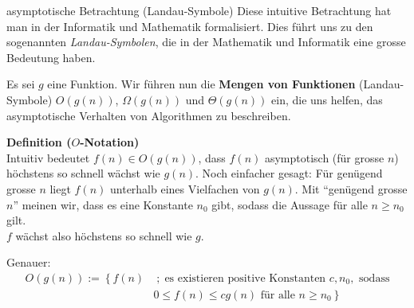 \begin{frame}{asymptotische Betrachtung (Landau-Symbole)}
	Diese intuitive Betrachtung hat man in der Informatik und Mathematik formalisiert. Dies führt uns zu den sogenannten \textit{Landau-Symbolen}, die in der Mathematik und Informatik eine grosse Bedeutung haben.

	\vspace{\baselineskip}
	Es sei $g$ eine Funktion. Wir führen nun die \textbf{Mengen von Funktionen} (Landau-Symbole) $O(g(n))$, $\Omega(g(n))$ und $\Theta(g(n))$ ein, die uns helfen, das asymptotische Verhalten von Algorithmen zu beschreiben.
\end{frame}


\begin{frame}
\textbf{Definition ($O$-Notation)}\\
Intuitiv bedeutet $f(n)\in O(g(n))$, dass $f(n)$ asymptotisch (für grosse $n$) höchstens so schnell wächst wie $g(n)$. Noch einfacher gesagt: Für genügend grosse $n$ liegt $f(n)$ unterhalb eines Vielfachen von $g(n)$. Mit \enquote{genügend grosse $n$} meinen wir, dass es eine Konstante $n_0$ gibt, sodass die Aussage für alle $n\geq n_0$ gilt.\\

\vspace{\baselineskip}
$f$ wächst also höchstens so schnell wie $g$.

\vspace{\baselineskip}
Genauer:
\begin{align}\label{eq:grossO}
    O(g(n)) := \left\{ f(n) \right. &  \; ; \; \text{es existieren positive Konstanten } c, n_0, \text{ sodass} \nonumber \\
    & \left. 0 \leq f(n) \leq c g(n) \text{ für alle } n \geq n_0 \right\}
\end{align}
\end{frame}


